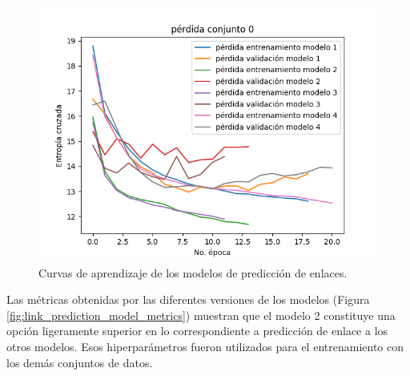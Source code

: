 \begin{figure}[h!]
	\begin{center}
		\includegraphics[scale=.7]{Graphics/persuassive_essays_all_linked_link_prediction_loss_model_1.png}
	    \caption{Curvas de aprendizaje de los modelos de predicción de enlaces.}\label{fig:link_prediction_model_loss}
	\end{center}
\end{figure}

Las métricas obtenidas por las diferentes versiones de los modelos 
(Figura \ref{fig:link_prediction_model_metrics}) 
muestran que el modelo 2 constituye una opción ligeramente superior en lo correspondiente a 
predicción de enlace a los otros modelos. Esos hiperparámetros
fueron utilizados para el entrenamiento con los demás conjuntos de datos.

